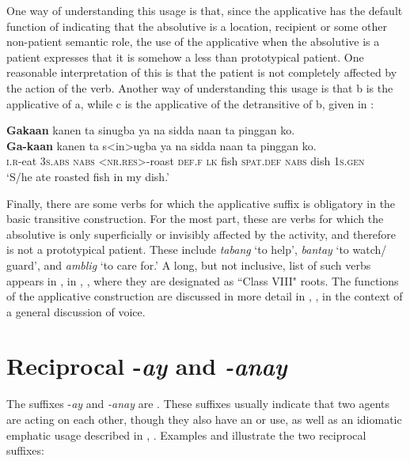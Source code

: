 One way of understanding this usage is that, since the applicative has the default function of indicating that the absolutive is a location, recipient or some other non-patient semantic role, the use of the applicative when the absolutive is a patient expresses that it is somehow a less than prototypical patient. One reasonable interpretation of this is that the patient is not completely affected by the action of the verb. Another way of understanding this usage is that b is the applicative of a, while c is the applicative of the detransitive of b, given in :

\ea
\label{bkm:Ref460337201}
\textbf{Gakaan}  kanen  ta  sinugba  ya  na  sidda  naan  ta pinggan  ko. \\\smallskip
\gll \textbf{Ga-kaan}  kanen  ta  s<in>ugba  ya  na  sidda  naan  ta pinggan  ko. \\
\textsc{i.r}-eat  3\textsc{s.abs}  \textsc{nabs}  <\textsc{nr.res}>-roast  \textsc{def.f}  \textsc{lk} fish  \textsc{spat.def} \textsc{nabs} dish  1\textsc{s.gen} \\
\glt ‘S/he ate roasted fish in my dish.’
\z

Finally, there are some verbs for which the applicative suffix is obligatory in the basic transitive construction. For the most part, these are verbs for which the absolutive is only superficially or invisibly affected by the activity, and therefore is not a prototypical patient. These include \textit{tabang} ‘to help’, \textit{bantay} ‘to watch/ guard’, and \textit{amblig} ‘to care for.’ A long, but not inclusive, list of such verbs appears in , in , , where they are designated as ``Class VIII" roots. The functions of the applicative construction are discussed in more detail in , , in the context of a general discussion of voice.
\section{Reciprocal -\textit{ay} and \textit{-anay}}
\label{sec:reciprocals}

The suffixes -\textit{ay} and \textit{{}-anay} are . These suffixes usually indicate that two agents are acting on each other, though they also have an  or  use, as well as an idiomatic emphatic usage described in , . Examples  and  illustrate the two reciprocal suffixes:


